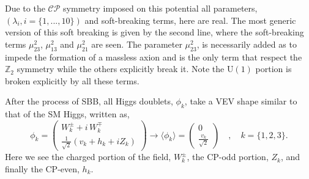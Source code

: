 %
Due to the $\mathcal{CP}$ symmetry imposed on this potential all parameters, $(\lambda_i,i=\{1,...,10\})$ and soft-breaking terms, here are real.
%
The most generic version of this soft breaking is given by the second line, where the soft-breaking terms $\mu_{23}^2$, $\mu_{13}^2$ and $\mu_{21}^2$ are seen. 
%
The parameter $\mu_{23}^2$, is necessarily added as to impede the formation of a massless axion and is the only term that respect the $\mathbb{Z}_2$ symmetry while the others explicitly break it. Note the  $\mathrm{U(1)}$ portion is broken explicitly by all these terms. 
%
%
%

After the process of SBB, all Higgs doublets, $\phi_k$, take a VEV shape similar to that of the SM Higgs, written as, 
%
\begin{equation}
\phi_k = 
\begin{pmatrix}
W_k^\pm + i \, W_k^\mp \\ 
\frac{1}{\sqrt{2}}\left( v_k + h_k + i Z_k \right)
\end{pmatrix}  \rightarrow \langle \phi_k \rangle = \begin{pmatrix}
0 \\ 
\frac{v_k}{\sqrt{2}}
\end{pmatrix} \quad , \quad k=\{ 1,2,3\} .  
\label{eq:3HDM_Higgs_Field_VEV} 
\end{equation} 
%
Here we see the charged portion of the field, $W_k^\pm$, the CP-odd portion, $Z_k$, and finally the CP-even, $h_k$. 
%
%

